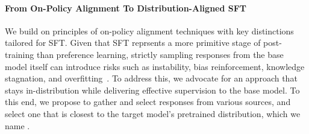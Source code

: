 \paragraph{From On-Policy Alignment To Distribution-Aligned SFT}
\label{sec:on_policy}
We build on principles of on-policy alignment techniques with key distinctions tailored for SFT. Given that SFT reprsents a more primitive stage of post-training than preference learning, strictly sampling responses from the base model itself can introduce risks such as instability, bias reinforcement, knowledge stagnation, and overfitting~\cite{herel2024collapseselftrainedlanguagemodels,mobahi2020selfdistillationamplifiesregularizationhilbert,allenzhu2023understandingensembleknowledgedistillation}. To address this, we advocate for an approach that stays in-distribution while delivering effective supervision to the base model. To this end, we propose to gather and select responses from various sources, and select one that is closest to the target model's pretrained distribution, which we name \name. 


